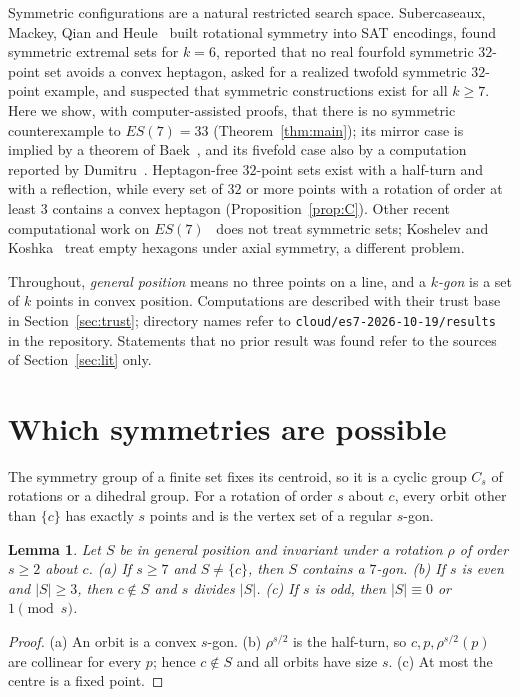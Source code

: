 \documentclass[11pt]{article}
\newtheorem{lemma}[theorem]{Lemma}
\theoremstyle{remark}
\begin{document}
Symmetric configurations are a natural restricted search space. Subercaseaux, Mackey, Qian and Heule~\cite{SMQH25}
built rotational symmetry into SAT encodings, found symmetric extremal sets for $k=6$, reported that no real fourfold
symmetric $32$-point set avoids a convex heptagon, asked for a realized twofold symmetric $32$-point example, and
suspected that symmetric constructions exist for all $k\ge7$. Here we show, with computer-assisted proofs, that there is
no symmetric counterexample to $ES(7)=33$ (Theorem~\ref{thm:main}); its mirror case is implied by a theorem of
Baek~\cite{Bae25}, and its fivefold case also by a computation reported by Dumitru~\cite{Dum25}. Heptagon-free
$32$-point sets exist with a half-turn and with a reflection, while every set of $32$ or more points with a rotation of
order at least $3$ contains a convex heptagon (Proposition~\ref{prop:C}).
Other recent computational work on $ES(7)$~\cite{Dum25,KPH26,ZLRO26,Sch26,GGTW25} does not treat symmetric sets;
Koshelev and Koshka~\cite{KK26} treat empty hexagons under axial symmetry, a different problem.

Throughout, \emph{general position} means no three points on a line, and a \emph{$k$-gon} is a set of $k$ points in convex
position. Computations are described with their trust base in Section~\ref{sec:trust}; directory names refer to
\texttt{cloud/es7-2026-10-19/results} in the repository. Statements that no prior result was found refer to the sources
of Section~\ref{sec:lit} only.

\section{Which symmetries are possible}
The symmetry group of a finite set fixes its centroid, so it is a cyclic group $C_s$ of rotations or a dihedral group.
For a rotation of order $s$ about $c$, every orbit other than $\{c\}$ has exactly $s$ points and is the vertex set of a
regular $s$-gon.
\begin{lemma}\label{lem:sizes}
Let $S$ be in general position and invariant under a rotation $\rho$ of order $s\ge 2$ about $c$.
(a) If $s\ge 7$ and $S\ne\{c\}$, then $S$ contains a $7$-gon.
(b) If $s$ is even and $|S|\ge 3$, then $c\notin S$ and $s$ divides $|S|$.
(c) If $s$ is odd, then $|S|\equiv 0$ or $1 \pmod s$.
\end{lemma}
\begin{proof}
(a) An orbit is a convex $s$-gon. (b) $\rho^{s/2}$ is the half-turn, so $c,p,\rho^{s/2}(p)$ are collinear for every $p$;
hence $c\notin S$ and all orbits have size $s$. (c) At most the centre is a fixed point.
\end{proof}
\end{document}
